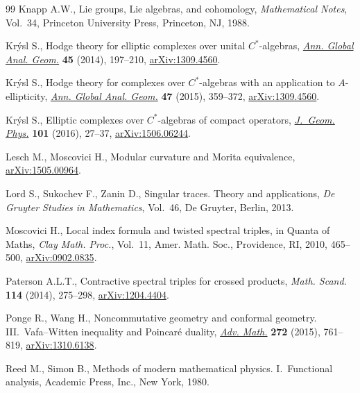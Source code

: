\documentclass[pdftex]{sigma}
\numberwithin{equation}{section}
\begin{document}
\begin{thebibliography}{99}
Knapp A.W., Lie groups, {L}ie algebras, and cohomology, \textit{Mathematical
 Notes}, Vol.~34, Princeton University Press, Princeton, NJ, 1988.

Kr{\'y}sl S., Hodge theory for elliptic complexes over unital {$C^*$}-algebras,
 \href{http://dx.doi.org/10.1007/s10455-013-9394-9}{\textit{Ann. Global Anal. Geom.}} \textbf{45} (2014), 197--210,
 \href{http://arxiv.org/abs/1309.4560}{arXiv:1309.4560}.

Kr{\'y}sl S., Hodge theory for complexes over {$C^*$}-algebras with an
 application to {$A$}-ellipticity, \href{http://dx.doi.org/10.1007/s10455-015-9449-1}{\textit{Ann. Global Anal. Geom.}}
 \textbf{47} (2015), 359--372, \href{http://arxiv.org/abs/1309.4560}{arXiv:1309.4560}.

Kr{\'y}sl S., Elliptic complexes over {$C^*$}-algebras of compact operators,
 \href{http://dx.doi.org/10.1016/j.geomphys.2015.12.001}{\textit{J.~Geom. Phys.}} \textbf{101} (2016), 27--37, \href{http://arxiv.org/abs/1506.06244}{arXiv:1506.06244}.

Lesch M., Moscovici H., Modular curvature and {Morita} equivalence,
 \href{http://arxiv.org/abs/1505.00964}{arXiv:1505.00964}.

Lord S., Sukochev F., Zanin D., Singular traces. Theory and applications,
 \textit{De Gruyter Studies in Mathematics}, Vol.~46, De Gruyter, Berlin,
 2013.

Moscovici H., Local index formula and twisted spectral triples, in Quanta of
 Maths, \textit{Clay Math. Proc.}, Vol.~11, Amer. Math. Soc., Providence, RI,
 2010, 465--500, \href{http://arxiv.org/abs/0902.0835}{arXiv:0902.0835}.

Paterson A.L.T., Contractive spectral triples for crossed products,
 \textit{Math. Scand.} \textbf{114} (2014), 275--298, \href{http://arxiv.org/abs/1204.4404}{arXiv:1204.4404}.

Ponge R., Wang H., Noncommutative geometry and conformal geometry.
 {III}.~{V}afa--{W}itten inequality and {P}oincar\'e duality, \href{http://dx.doi.org/10.1016/j.aim.2014.12.009}{\textit{Adv.
 Math.}} \textbf{272} (2015), 761--819, \href{http://arxiv.org/abs/1310.6138}{arXiv:1310.6138}.

Reed M., Simon B., Methods of modern mathematical physics. {I}.~Functional
 analysis, Academic Press, Inc., New York, 1980.


\end{thebibliography}
\end{document}
